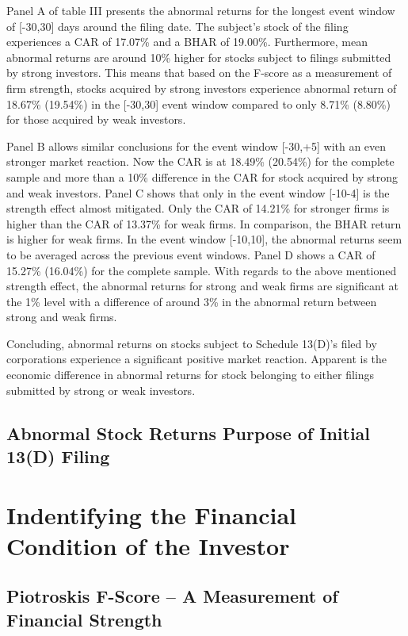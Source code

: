 \documentclass[12pt]{article}
\begin{document}
Panel A of table III presents the abnormal returns for the longest event window of [-30,30] days around the filing date. The subject's stock of the filing experiences a CAR of 17.07\% and a BHAR of 19.00\%. Furthermore, mean abnormal returns are around 10\% higher for stocks subject to filings submitted by strong investors. This means that based on the F-score as a measurement of firm strength, stocks acquired by strong investors experience abnormal return of 18.67\% (19.54\%) in the [-30,30] event window compared to only 8.71\% (8.80\%) for those acquired by weak investors. 

Panel B allows similar conclusions for the event window [-30,+5] with an even stronger market reaction. Now the CAR is at 18.49\% (20.54\%) for the complete sample and more than a 10\% difference in the CAR for stock acquired by strong and weak investors.
Panel C shows that only in the event window [-10-4] is the strength effect almost mitigated. Only the CAR of 14.21\% for stronger firms is higher than the CAR of 13.37\% for weak firms. In comparison, the BHAR return is higher for weak firms. 
In the event window [-10,10], the abnormal returns seem to be averaged across the previous event windows. Panel D shows a CAR of 15.27\%  (16.04\%) for the complete sample. With regards to the above mentioned strength effect, the abnormal returns for strong and weak firms are significant at the 1\% level with a difference of around 3\% in the abnormal return between strong and weak firms. 

Concluding, abnormal returns on stocks subject to Schedule 13(D)'s filed by corporations experience a significant positive market reaction. Apparent is the economic difference in abnormal returns for stock belonging to either filings submitted by strong or weak investors. 

\pagebreak

\subsection{Abnormal Stock Returns Purpose of Initial 13(D) Filing}


  

\section{Indentifying the Financial Condition of the Investor}
 

\subsection{Piotroskis F-Score -- A Measurement of Financial Strength}
\end{document}
